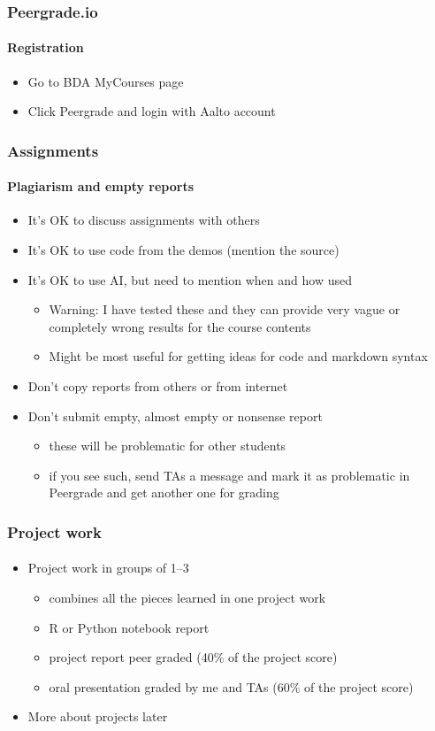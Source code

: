 \documentclass[english,t]{beamer}
\begin{document}
\begin{frame}
  \frametitle{Peergrade.io}  %
  \framesubtitle{Registration}
  \begin{itemize}
  \item Go to BDA MyCourses page
  \item Click Peergrade and login with Aalto account
  \end{itemize}
  
\end{frame}

\begin{frame}
  \frametitle{Assignments}  %
  \framesubtitle{Plagiarism and empty reports}
  \begin{itemize}
  \item It's OK to discuss assignments with others
  \item It's OK to use code from the demos (mention the source)
  \item It's OK to use AI, but need to mention when and how used
    \begin{itemize}
    \item Warning: I have tested these and they can provide very vague
      or completely wrong results for the course contents
    \item Might be most useful for getting ideas for code and markdown syntax
    \end{itemize}
  \item Don't copy reports from others or from internet
  \item Don't submit empty, almost empty or nonsense report
    \begin{itemize}
    \item these will be problematic for other students
    \item if you see such, send TAs a message and mark it as
      problematic in Peergrade and get another one for grading
    \end{itemize}
  \end{itemize}
  
\end{frame}


\begin{frame}
  \frametitle{Project work}  %
  \framesubtitle{}
  \begin{itemize}
  \item Project work in groups of 1--3
    \begin{itemize}
    \item combines all the pieces learned in one project work
    \item R or Python notebook report
    \item project report peer graded (40\% of the project score)
    \item oral presentation graded by me and TAs (60\% of the project score)
    \end{itemize}
  \item More about projects later
  \end{itemize}
  
\end{frame}
\end{document}
